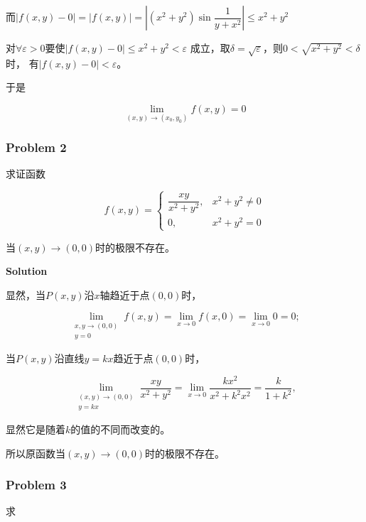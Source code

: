 \documentclass[12pt, a4paper]{article}
\numberwithin{equation}{section}
\begin{document}
    而$\left|f(x, y)-0\right|=\left|f(x, y)\right|=
    \left|\left(x^2+y^2\right) \sin \dfrac{1}{y+x^2}\right| \leq x^2+y^2$

    对\(\forall \varepsilon > 0\)要使$\left|f(x, y)-0\right| \leq x^2+y^2 < \varepsilon$
    成立，取$\delta = \sqrt{\varepsilon}$，则\(0 < \sqrt{x^2+y^2} < \delta\)时，
    有$\left|f(x, y)-0\right| < \varepsilon$。

    于是
    
    \[
        \lim_{\left(x,y\right) \rightarrow \left(x_0,y_0\right)}f\left(x,y\right) = 0
    \]

\subsubsection{Problem 2}

    求证函数

    $$
        f(x, y)= \begin{cases}\dfrac{x y}{x^2+y^2}, & x^2+y^2 \neq 0 \\ 0, & x^2+y^2=0\end{cases}
    $$

    当$\left(x,y\right) \rightarrow \left(0,0\right)$时的极限不存在。
    \vspace{1em}

    \textbf{Solution}
    \vspace{1em}

    显然，当\(P\left(x,y\right)\)沿\(x\)轴趋近于点\(\left(0,0\right)\)时，

    $$
        \lim_{\substack{x, y \rightarrow(0,0) \\ y=0}} f(x, y)=\lim_{x \rightarrow 0} f(x, 0)=\lim _{x \rightarrow 0} 0=0 ;
    $$

    当\(P\left(x,y\right)\)沿直线\(y = kx\)趋近于点\(\left(0,0\right)\)时，

    $$
        \lim_{\substack{(x, y) \rightarrow(0,0) \\ y=k x}} \frac{x y}{x^2+y^2}=\lim_{x \rightarrow 0} \frac{k x^2}{x^2+k^2 x^2}=\frac{k}{1+k^2},
    $$

    显然它是随着\(k\)的值的不同而改变的。

    所以原函数当$\left(x,y\right) \rightarrow \left(0,0\right)$时的极限不存在。

\subsubsection{Problem 3}

    求
\end{document}

